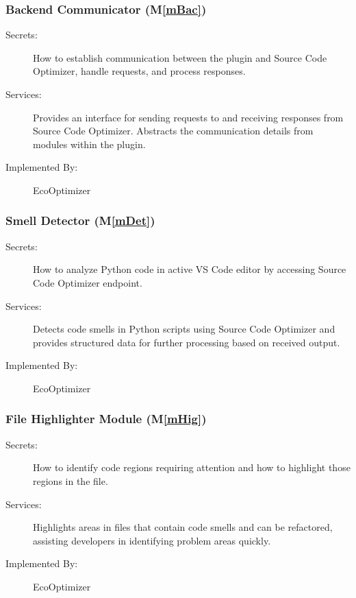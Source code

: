\documentclass[12pt, titlepage]{article}
\newcommand{\mref}[1]{M\ref{#1}}
\begin{document}
\subsubsection{Backend Communicator (\mref{mBac})}


\begin{description}
    \item[Secrets:] How to establish communication between the plugin and Source Code Optimizer, handle requests, and process responses.
    \item[Services:] Provides an interface for sending requests to and receiving responses from Source Code Optimizer. Abstracts the communication details from modules within the plugin.
    \item[Implemented By:] EcoOptimizer
\end{description}

\subsubsection{Smell Detector (\mref{mDet})}


\begin{description}
    \item[Secrets:] How to analyze Python code in active VS Code editor by accessing Source Code Optimizer endpoint.
    \item[Services:] Detects code smells in Python scripts using Source Code Optimizer and provides structured data for further processing based on received output.
    \item[Implemented By:] EcoOptimizer
\end{description}

\subsubsection{File Highlighter Module (\mref{mHig})}


\begin{description}
    \item[Secrets:] How to identify code regions requiring attention and how to highlight those regions in the file.
    \item[Services:] Highlights areas in files that contain code smells and can be refactored, assisting developers in identifying problem areas quickly.
    \item[Implemented By:] EcoOptimizer
\end{description}
\end{document}

